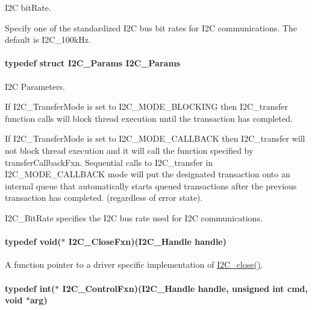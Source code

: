 I2\-C bit\-Rate. 

Specify one of the standardized I2\-C bus bit rates for I2\-C communications. The default is I2\-C\-\_\-100k\-Hz. 
\paragraph[{I2\-C\-\_\-\-Params}]{\setlength{\rightskip}{0pt plus 5cm}typedef struct {\bf I2\-C\-\_\-\-Params}  {\bf I2\-C\-\_\-\-Params}}\label{_i2_c_8h_ae6b2a2e3bc3716b5716ad6c1f10d7c1d}


I2\-C Parameters. 

If I2\-C\-\_\-\-Transfer\-Mode is set to I2\-C\-\_\-\-M\-O\-D\-E\-\_\-\-B\-L\-O\-C\-K\-I\-N\-G then I2\-C\-\_\-transfer function calls will block thread execution until the transaction has completed.

If I2\-C\-\_\-\-Transfer\-Mode is set to I2\-C\-\_\-\-M\-O\-D\-E\-\_\-\-C\-A\-L\-L\-B\-A\-C\-K then I2\-C\-\_\-transfer will not block thread execution and it will call the function specified by transfer\-Callback\-Fxn. Sequential calls to I2\-C\-\_\-transfer in I2\-C\-\_\-\-M\-O\-D\-E\-\_\-\-C\-A\-L\-L\-B\-A\-C\-K mode will put the designated transaction onto an internal queue that automatically starts queued transactions after the previous transaction has completed. (regardless of error state).

I2\-C\-\_\-\-Bit\-Rate specifies the I2\-C bus rate used for I2\-C communications. 
\paragraph[{I2\-C\-\_\-\-Close\-Fxn}]{\setlength{\rightskip}{0pt plus 5cm}typedef void($\ast$ I2\-C\-\_\-\-Close\-Fxn)({\bf I2\-C\-\_\-\-Handle} handle)}\label{_i2_c_8h_a4a97bfbbab241bfc50dbad36ce112e74}


A function pointer to a driver specific implementation of \hyperlink{_i2_c_8h_a12c86d89a687f2ee1eb980d99c32326d}{I2\-C\-\_\-close()}. 

\paragraph[{I2\-C\-\_\-\-Control\-Fxn}]{\setlength{\rightskip}{0pt plus 5cm}typedef int($\ast$ I2\-C\-\_\-\-Control\-Fxn)({\bf I2\-C\-\_\-\-Handle} handle, unsigned int cmd, void $\ast$arg)}\label{_i2_c_8h_ac269dcf2d893ffe5a5c085c11e4e5f84}


